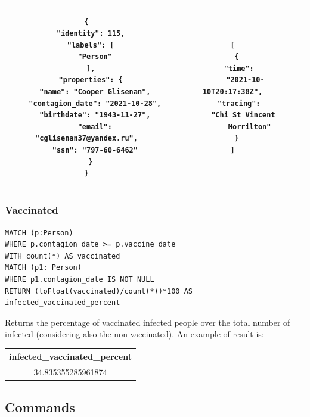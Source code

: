 \documentclass[12pt, a4paper]{article}
\begin{document}
\begin{scriptsize}
\begin{center}
\begin{longtable}{ |c|c|c| }
\begin{minipage}{7,2cm}
\begin{verbatim}
{
  "identity": 115,
  "labels": [
    "Person"
  ],
  "properties": {
    "name": "Cooper Glisenan",
    "contagion_date": "2021-10-28",
    "birthdate": "1943-11-27",
    "email": "cglisenan37@yandex.ru",
    "ssn": "797-60-6462"
  }
}
                \end{verbatim}
            \end{minipage}
            & 
            \begin{minipage}{5cm}
                \begin{verbatim}
[
  {
    "time": 
      "2021-10-10T20:17:38Z",
    "tracing": 
      "Chi St Vincent 
        Morrilton"
  }
]
                \end{verbatim}
            \end{minipage} \\
            \hline
        \end{longtable}
    \end{center}
\end{scriptsize}

\subsubsection{Vaccinated}

\begin{tcolorbox}[fontupper=\scriptsize]
    \begin{verbatim}
MATCH (p:Person)
WHERE p.contagion_date >= p.vaccine_date
WITH count(*) AS vaccinated
MATCH (p1: Person)
WHERE p1.contagion_date IS NOT NULL
RETURN (toFloat(vaccinated)/count(*))*100 AS infected_vaccinated_percent
    \end{verbatim}
\end{tcolorbox}

\noindent %
Returns the percentage of vaccinated infected people over the total 
number of infected (considering also the non-vaccinated).
An example of result is: 

\begin{center}
    \begin{tabular}{ |c| } 
        \hline
        infected\_vaccinated\_percent \\
        \hline
        34.835355285961874 \\
        \hline
    \end{tabular}
\end{center}

\subsection{Commands}
\end{document}
